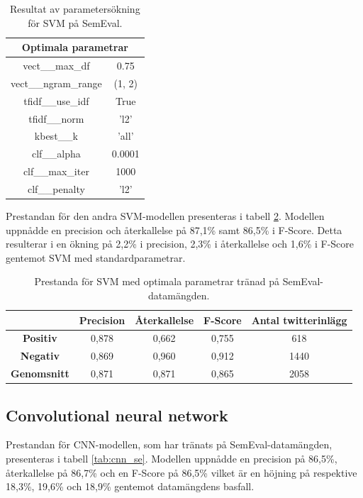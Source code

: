 \documentclass{kaumasters} %
\begin{document}
\begin{table}[H]
\centering
\caption{Resultat av parametersökning för SVM på SemEval.}
\label{tab:svm_grid_se}
    \begin{tabular}{cc}
    \toprule
    \multicolumn{2}{c}{\textbf{Optimala parametrar}} \\
    \midrule
    vect\_\_max\_df & 0.75  \\
    vect\_\_ngram\_range & (1, 2)  \\
    tfidf\_\_use\_idf & True  \\
    tfidf\_\_norm & 'l2'  \\
    kbest\_\_k & 'all' \\
    clf\_\_alpha & 0.0001 \\
    clf\_\_max\_iter & 1000 \\
    clf\_\_penalty & 'l2' \\
    \bottomrule
\end{tabular}
\end{table}

Prestandan för den andra SVM-modellen presenteras i tabell \ref{tab:svm_imp_se}. Modellen uppnådde en precision och återkallelse på 87,1\% samt 86,5\% i F-Score. Detta resulterar i en ökning på 2,2\% i precision, 2,3\% i återkallelse och 1,6\% i F-Score gentemot SVM med standardparametrar.

\begin{table}[H]
\centering
\caption{Prestanda för SVM med optimala parametrar tränad på SemEval-datamängden.}
\label{tab:svm_imp_se}
    \begin{tabular}{ccccc}
    \toprule
     & \textbf{Precision} & \textbf{Återkallelse} & \textbf{F-Score} & \textbf{Antal twitterinlägg}  \\
    \midrule
    \textbf{Positiv} & 0,878 & 0,662 & 0,755 & 618 \\
    \textbf{Negativ} & 0,869 & 0,960 & 0,912 & 1440 \\
    \midrule
    \textbf{Genomsnitt} & 0,871 & 0,871 & 0,865  & 2058 \\
    \bottomrule
\end{tabular}
\end{table}

\subsection{Convolutional neural network}
Prestandan för CNN-modellen, som har tränats på SemEval-datamängden, presenteras i tabell \ref{tab:cnn_se}. Modellen uppnådde en precision på 86,5\%, återkallelse på 86,7\% och en F-Score på 86,5\% vilket är en höjning på respektive 18,3\%, 19,6\% och 18,9\% gentemot datamängdens basfall. 
\end{document}
